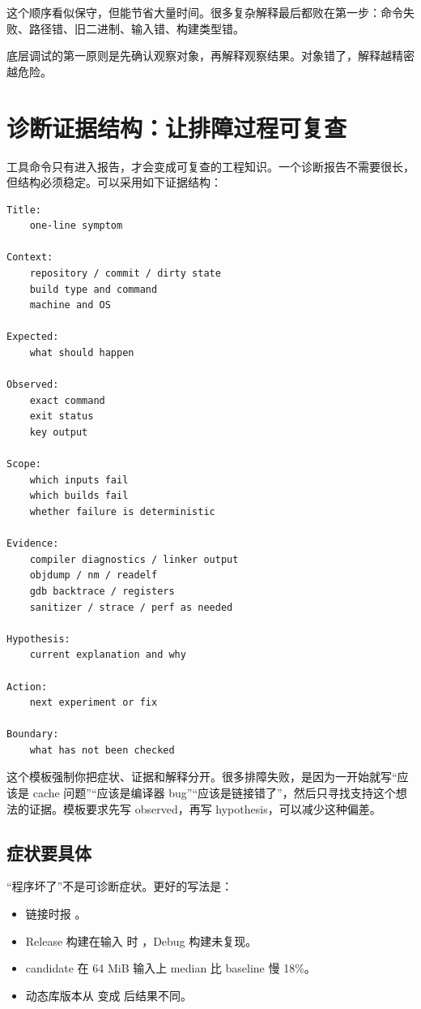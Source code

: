 这个顺序看似保守，但能节省大量时间。很多复杂解释最后都败在第一步：命令失败、路径错、旧二进制、输入错、构建类型错。

\begin{keyidea}
底层调试的第一原则是先确认观察对象，再解释观察结果。对象错了，解释越精密越危险。
\end{keyidea}

\section{诊断证据结构：让排障过程可复查}

工具命令只有进入报告，才会变成可复查的工程知识。一个诊断报告不需要很长，但结构必须稳定。可以采用如下证据结构：

\begin{lstlisting}
Title:
    one-line symptom

Context:
    repository / commit / dirty state
    build type and command
    machine and OS

Expected:
    what should happen

Observed:
    exact command
    exit status
    key output

Scope:
    which inputs fail
    which builds fail
    whether failure is deterministic

Evidence:
    compiler diagnostics / linker output
    objdump / nm / readelf
    gdb backtrace / registers
    sanitizer / strace / perf as needed

Hypothesis:
    current explanation and why

Action:
    next experiment or fix

Boundary:
    what has not been checked
\end{lstlisting}

这个模板强制你把症状、证据和解释分开。很多排障失败，是因为一开始就写“应该是 cache 问题”“应该是编译器 bug”“应该是链接错了”，然后只寻找支持这个想法的证据。模板要求先写 observed，再写 hypothesis，可以减少这种偏差。

\subsection{症状要具体}

“程序坏了”不是可诊断症状。更好的写法是：

\begin{itemize}
  \item {} 链接时报 。
  \item Release 构建在输入  时 ，Debug 构建未复现。
  \item {} candidate 在 64 MiB 输入上 median 比 baseline 慢 18\%。
  \item 动态库版本从  变成  后结果不同。
\end{itemize}

